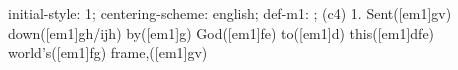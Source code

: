 initial-style: 1;
centering-scheme: english;
def-m1: \grealign;
(c4) 1. Sent([em1]gv) down([em1]gh/ijh) by([em1]g) God([em1]fe) to([em1]d) this([em1]dfe) world's([em1]fg) frame,([em1]gv)